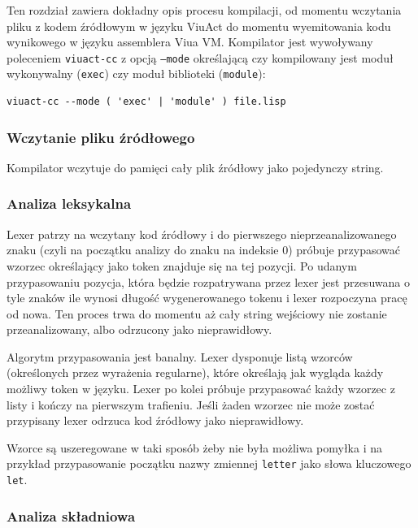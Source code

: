\documentclass[11pt,oneside,a4paper,titlepage,onecolumn]{article}
\begin{document}
Ten rozdział zawiera dokładny opis procesu kompilacji, od momentu wczytania pliku z kodem źródłowym w języku
ViuAct do momentu wyemitowania kodu wynikowego w języku assemblera Viua VM. Kompilator jest wywoływany
poleceniem \texttt{viuact-cc} z opcją \texttt{--mode} określającą czy kompilowany jest moduł wykonywalny
(\texttt{exec}) czy moduł biblioteki (\texttt{module}):

\begin{lstlisting}
viuact-cc --mode ( 'exec' | 'module' ) file.lisp
\end{lstlisting}

\subsubsection{Wczytanie pliku źródłowego}

Kompilator wczytuje do pamięci cały plik źródłowy jako pojedynczy string.

\subsubsection{Analiza leksykalna}

Lexer patrzy na wczytany kod źródłowy i do pierwszego nieprzeanalizowanego znaku (czyli na początku analizy do
znaku na indeksie 0) próbuje przypasować wzorzec określający jako token znajduje się na tej pozycji. Po udanym
przypasowaniu pozycja, która będzie rozpatrywana przez lexer jest przesuwana o tyle znaków ile wynosi długość
wygenerowanego tokenu i lexer rozpoczyna pracę od nowa. Ten proces trwa do momentu aż cały string wejściowy
nie zostanie przeanalizowany, albo odrzucony jako nieprawidłowy.

Algorytm przypasowania jest banalny. Lexer dysponuje listą wzorców (określonych przez wyrażenia regularne),
które określają jak wygląda każdy możliwy token w języku. Lexer po kolei próbuje przypasować każdy wzorzec z
listy i kończy na pierwszym trafieniu. Jeśli żaden wzorzec nie może zostać przypisany lexer odrzuca kod
źródłowy jako nieprawidłowy.

Wzorce są uszeregowane w taki sposób żeby nie była możliwa pomyłka i
na przykład przypasowanie początku nazwy zmiennej \texttt{letter} jako słowa kluczowego \texttt{let}.

\subsubsection{Analiza składniowa}
\end{document}
